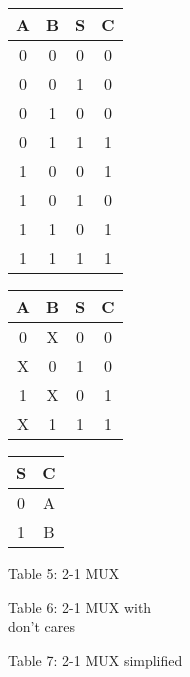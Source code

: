 \documentclass[fleqn]{article}
\begin{document}
\begin{multicols}{3}
\begin{table}[H]
\centering
\begin{tabular}{ccc|c}
\textbf{A} & \textbf{B} & \textbf{S} & \textbf{C} \\ \hline
0 & 0 & 0 & 0 \\ 
0 & 0 & 1 & 0 \\
0 & 1 & 0 & 0 \\
0 & 1 & 1 & 1 \\
1 & 0 & 0 & 1 \\
1 & 0 & 1 & 0 \\
1 & 1 & 0 & 1 \\
1 & 1 & 1 & 1
\end{tabular}
\end{table}

\columnbreak

\begin{table}[H]
    \centering
    \begin{tabular}{ccc|c}
    \textbf{A} & \textbf{B} & \textbf{S} & \textbf{C} \\ \hline
    0 & X & 0 & 0 \\
    X & 0 & 1 & 0 \\
    1 & X & 0 & 1 \\
    X & 1 & 1 & 1
    \end{tabular}
    \end{table}

\columnbreak

\begin{table}[H]
\centering
\begin{tabular}{c|c}
\textbf{S} & \textbf{C} \\ \hline
0 & A \\
1 & B
\end{tabular}
\end{table}
\end{multicols}


\begin{multicols}{3}
\begin{center}Table 5: 2-1 MUX\end{center}
\columnbreak
\begin{center}Table 6: 2-1 MUX with \\don't cares\end{center}
\columnbreak
\begin{center}Table 7: 2-1 MUX simplified\end{center}
\end{multicols}
\end{document}
